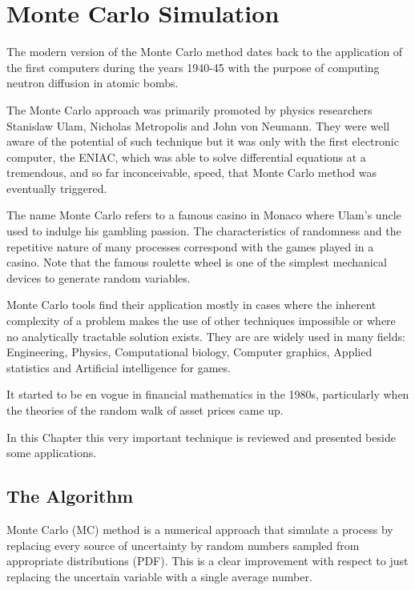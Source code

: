 \chapter{Monte Carlo Simulation}
\label{cap:montecarlo}

The modern version of the Monte Carlo method dates back to the application of the first computers during the years 1940-45 with the purpose of computing neutron diffusion in atomic bombs.

The Monte Carlo approach was primarily promoted by physics researchers Stanislaw Ulam, Nicholas Metropolis and John von Neumann. They were well aware of the potential of such technique but it was only with the first electronic computer, the ENIAC, which was able to solve differential equations at a tremendous, and so far inconceivable, speed, that Monte Carlo method was eventually triggered.

The name Monte Carlo refers to a famous casino in Monaco where Ulam's uncle used to indulge his gambling passion. 
The characteristics of randomness and the repetitive nature of many processes correspond with the games played in a casino. Note that the famous roulette wheel is one of the simplest mechanical devices to generate random variables.

Monte Carlo tools find their application mostly in cases where the inherent complexity of a problem makes the use of other techniques impossible or where no analytically tractable solution exists.
They are are widely used in many fields: Engineering, Physics, Computational biology, Computer graphics, Applied statistics and Artificial intelligence for games.

It started to be en vogue in financial mathematics in the 1980s, particularly when the theories of the random walk of asset prices came up.

In this Chapter this very important technique is reviewed and presented beside some applications.

\section{The Algorithm}
\label{whats-monte-carlo-simulation}

Monte Carlo (MC) method is a numerical approach that simulate a process by replacing every source of uncertainty by random numbers sampled from appropriate distributions (PDF). This is a clear improvement with respect to just replacing the uncertain variable with a single average number.

